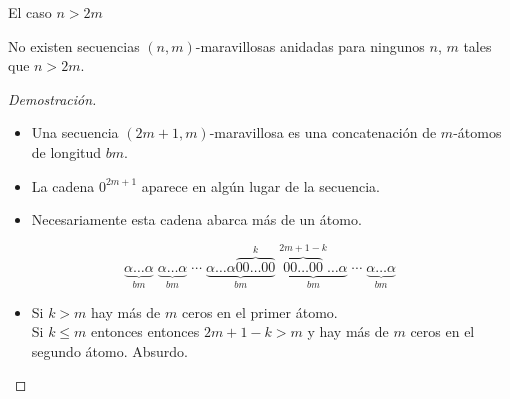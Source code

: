 \documentclass[spanish,xcolor={table}]{beamer}
\begin{document}

\begin{frame}{El caso $n > 2m$}

\begin{theorem}
  No existen secuencias $(n,m)$-maravillosas anidadas para ningunos $n$, $m$
	tales que $n > 2m$.
\end{theorem}

\begin{proof}[Demostración\nopunct]
  \begin{itemize}
    \item Una secuencia $(2m + 1,m)$-maravillosa es una concatenación
    de $m$-átomos de longitud $bm$.
    \item La cadena $0^{2m+1}$ aparece en algún lugar de la secuencia.
    \item Necesariamente esta cadena abarca más de un átomo.
  \end{itemize}
  \[ \underbrace{\alpha\dots\alpha}_{bm}
    \; \underbrace{\alpha\dots\alpha}_{bm} \; \cdots
    \; \underbrace{\alpha\dots\alpha\overbrace{00\dots00}^{k}}_{bm}
    \; \underbrace{\overbrace{00\dots00}^{2m+1-k}\dots\alpha}_{bm} \; \cdots
    \; \underbrace{\alpha\dots\alpha}_{bm} \]
  \begin{itemize}
    \item Si $k > m$ hay más de $m$ ceros en el primer átomo. \\
    Si $k \leq m$ entonces entonces $2m + 1 - k > m$ y hay más de $m$ ceros en el segundo átomo. Absurdo. \qedhere
  \end{itemize}
\end{proof}

\end{frame}

\end{document}
